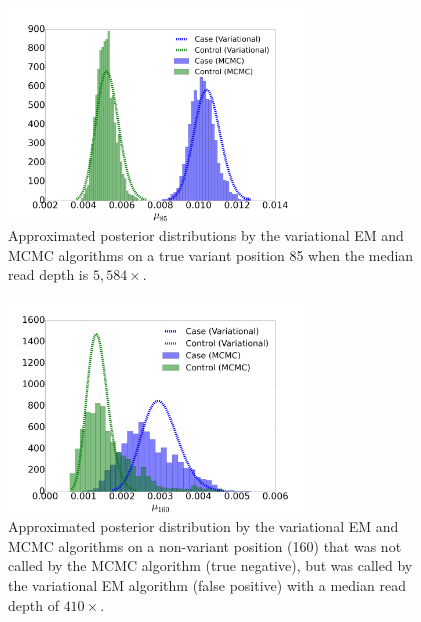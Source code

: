\documentclass{bmcart}
\begin{document}
\begin{backmatter}
\clearpage
\begin{figure}[htbp]
\centering
\includegraphics[width=0.7\textwidth]{fig1.png}
\caption{Approximated posterior distributions by the variational EM and MCMC algorithms on a true variant position 85 when the median read depth is $5,584\times$.}%
\end{figure}

\clearpage
\begin{figure}[htbp]
\centering
\includegraphics[width=0.7\textwidth]{fig2.png}
\caption{Approximated posterior distribution by the variational EM and MCMC algorithms on a non-variant position (160) that was not called by the MCMC algorithm (true negative), but was called by the variational EM algorithm (false positive) with a median read depth of $410\times$.}%
\end{figure}


\end{backmatter}
\end{document}

